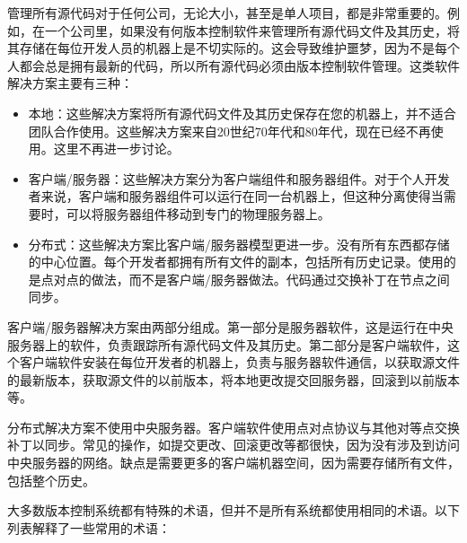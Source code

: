 管理所有源代码对于任何公司，无论大小，甚至是单人项目，都是非常重要的。例如，在一个公司里，如果没有何版本控制软件来管理所有源代码文件及其历史，将其存储在每位开发人员的机器上是不切实际的。这会导致维护噩梦，因为不是每个人都会总是拥有最新的代码，所以所有源代码必须由版本控制软件管理。这类软件解决方案主要有三种：

\begin{itemize}
\item
本地：这些解决方案将所有源代码文件及其历史保存在您的机器上，并不适合团队合作使用。这些解决方案来自20世纪70年代和80年代，现在已经不再使用。这里不再进一步讨论。

\item
客户端/服务器：这些解决方案分为客户端组件和服务器组件。对于个人开发者来说，客户端和服务器组件可以运行在同一台机器上，但这种分离使得当需要时，可以将服务器组件移动到专门的物理服务器上。

\item
分布式：这些解决方案比客户端/服务器模型更进一步。没有所有东西都存储的中心位置。每个开发者都拥有所有文件的副本，包括所有历史记录。使用的是点对点的做法，而不是客户端/服务器做法。代码通过交换补丁在节点之间同步。
\end{itemize}

客户端/服务器解决方案由两部分组成。第一部分是服务器软件，这是运行在中央服务器上的软件，负责跟踪所有源代码文件及其历史。第二部分是客户端软件，这个客户端软件安装在每位开发者的机器上，负责与服务器软件通信，以获取源文件的最新版本，获取源文件的以前版本，将本地更改提交回服务器，回滚到以前版本等。

分布式解决方案不使用中央服务器。客户端软件使用点对点协议与其他对等点交换补丁以同步。常见的操作，如提交更改、回滚更改等都很快，因为没有涉及到访问中央服务器的网络。缺点是需要更多的客户端机器空间，因为需要存储所有文件，包括整个历史。

大多数版本控制系统都有特殊的术语，但并不是所有系统都使用相同的术语。以下列表解释了一些常用的术语：

